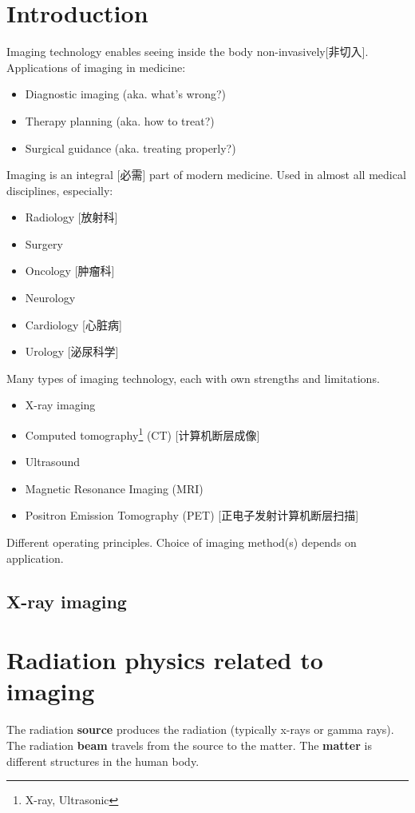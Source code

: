 \documentclass[UTF8,a4paper,11pt]{book}
\date{}
\theoremstyle{mystyle}{
  \newtheorem{example}{Example}
}
\begin{document}
\tableofcontents

\chapter{Introduction}
Imaging technology enables seeing inside the
body non-invasively[非切入].
Applications of imaging in medicine:
 \begin{itemize}
 \item Diagnostic imaging (aka. what's wrong?)
 \item Therapy planning (aka. how to treat?)
 \item Surgical guidance (aka. treating properly?)
 \end{itemize}

Imaging is an integral [必需] part of modern
medicine.
Used in almost all medical disciplines,
especially:
\begin{itemize}
\item Radiology [放射科]
\item Surgery
\item Oncology [肿瘤科]
\item Neurology
\item Cardiology [心脏病]
\item Urology [泌尿科学]
\end{itemize}

Many types of imaging technology, each with
own strengths and limitations.
\begin{itemize}
\item X-ray imaging 
\item Computed tomography\footnote{X-ray, Ultrasonic} (CT) [计算机断层成像]
\item Ultrasound
\item Magnetic Resonance Imaging (MRI)
\item Positron Emission Tomography (PET) [正电子发射计算机断层扫描]
\end{itemize}
 Different operating principles.
 Choice of imaging method(s) depends on
application.

\section{X-ray imaging}


\chapter{Radiation physics related to imaging}
The radiation \textbf{source} produces the radiation
(typically x-rays or gamma rays).
 The radiation \textbf{beam} travels from the source to
the matter.
 The \textbf{matter} is different structures in the
human body.
\end{document}
